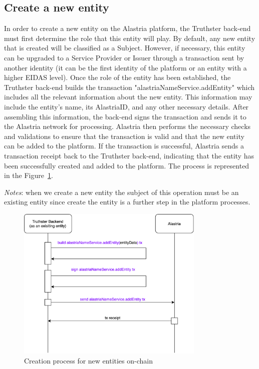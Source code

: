 \documentclass[target=mst,aauheader=]{thud}
\begin{document}
\subsection{Create a new entity}

In order to create a new entity on the Alastria platform, the Truthster back-end must first determine the role that this entity will play. By default, any new entity that is created will be classified as a Subject. However, if necessary, this entity can be upgraded to a Service Provider or Issuer through a transaction sent by another identity (it can be the first identity of the platform or an entity with a higher EIDAS level).
Once the role of the entity has been established, the Truthster back-end builds the transaction "alastriaNameService.addEntity" which includes all the relevant information about the new entity. This information may include the entity's name, its AlastriaID, and any other necessary details. After assembling this information, the back-end signs the transaction and sends it to the Alastria network for processing.
Alastria then performs the necessary checks and validations to ensure that the transaction is valid and that the new entity can be added to the platform. If the transaction is successful, Alastria sends a transaction receipt back to the Truthster back-end, indicating that the entity has been successfully created and added to the platform.
The process is represented in the Figure~\ref{fig:createNewGeneralEntity}.\par
\textit{Notes}: when we create a new entity the subject of this operation must be an existing entity since create the entity is a further step in the platform processes.

\begin{figure}
    \centering
    \includegraphics[width=0.8\textwidth]{images/createNewGeneralEntity.png}
    \caption{Creation process for new entities on-chain}
    \label{fig:createNewGeneralEntity}
\end{figure}
\end{document}

